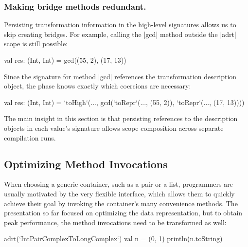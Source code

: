 \subsubsection{Making bridge methods redundant.} Persisting transformation information in the high-level signatures allows us to skip creating bridges. For example, calling the |gcd| method outside the |adrt| scope is still possible:

\begin{lstlisting-nobreak}
val res: (Int, Int) = gcd((55, 2), (17, 13))
\end{lstlisting-nobreak}

Since the signature for method |gcd| references the transformation description object, the \coerce{} phase knows exactly which coercions are necessary:

\begin{lstlisting-nobreak}
val res: (Int, Int) = `toHigh`(...,
  gcd(`toRepr`(..., (55, 2)), `toRepr`(..., (17, 13))))
\end{lstlisting-nobreak}

The main insight in this section is that persisting references to the description objects in each value's signature allows scope composition across separate compilation runs.%


\subsection{Optimizing Method Invocations}
\label{sec:ildl:method}

When choosing a generic container, such as a pair or a list, programmers are usually motivated by the very flexible interface, which allows them to quickly achieve their goal by invoking the container's many convenience methods. The presentation so far focused on optimizing the data representation, but to obtain peak performance, the method invocations need to be transformed as well:

\begin{lstlisting-nobreak}
adrt(`IntPairComplexToLongComplex`) {
  val n = (0, 1)
  println(n.toString)
}
\end{lstlisting-nobreak}


